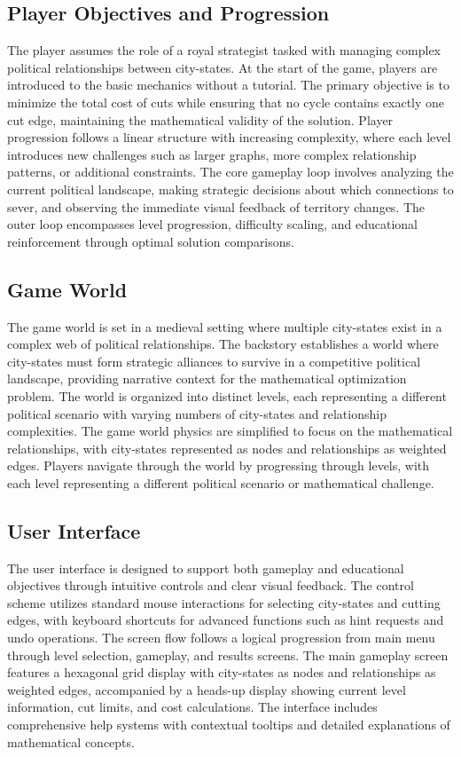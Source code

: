\documentclass[english]{tudscrreprt}
\begin{document}
\subsection{Player Objectives and Progression}
The player assumes the role of a royal strategist tasked with managing complex political relationships between city-states. At the start of the game, players are introduced to the basic mechanics without a tutorial. The primary objective is to minimize the total cost of cuts while ensuring that no cycle contains exactly one cut edge, maintaining the mathematical validity of the solution. Player progression follows a linear structure with increasing complexity, where each level introduces new challenges such as larger graphs, more complex relationship patterns, or additional constraints. The core gameplay loop involves analyzing the current political landscape, making strategic decisions about which connections to sever, and observing the immediate visual feedback of territory changes. The outer loop encompasses level progression, difficulty scaling, and educational reinforcement through optimal solution comparisons.

\subsection{Game World}
The game world is set in a medieval setting where multiple city-states exist in a complex web of political relationships. The backstory establishes a world where city-states must form strategic alliances to survive in a competitive political landscape, providing narrative context for the mathematical optimization problem. The world is organized into distinct levels, each representing a different political scenario with varying numbers of city-states and relationship complexities. The game world physics are simplified to focus on the mathematical relationships, with city-states represented as nodes and relationships as weighted edges. Players navigate through the world by progressing through levels, with each level representing a different political scenario or mathematical challenge.

\subsection{User Interface}
The user interface is designed to support both gameplay and educational objectives through intuitive controls and clear visual feedback. The control scheme utilizes standard mouse interactions for selecting city-states and cutting edges, with keyboard shortcuts for advanced functions such as hint requests and undo operations. The screen flow follows a logical progression from main menu through level selection, gameplay, and results screens. The main gameplay screen features a hexagonal grid display with city-states as nodes and relationships as weighted edges, accompanied by a heads-up display showing current level information, cut limits, and cost calculations. The interface includes comprehensive help systems with contextual tooltips and detailed explanations of mathematical concepts. 
\end{document}
